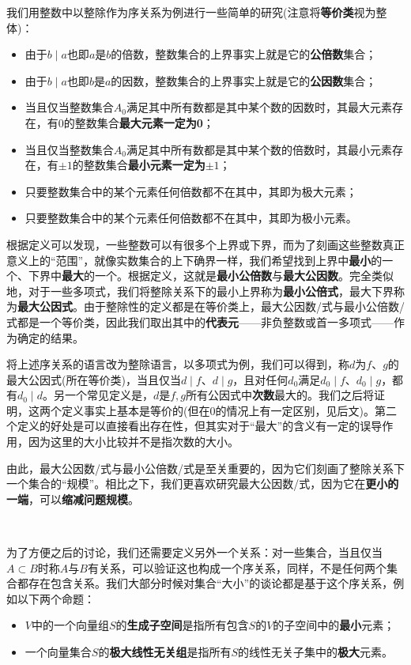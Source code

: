 \documentclass[a4paper,UTF8,fontset=windows,AutoFakeBold]{ctexart}
\newcommand*{\note}{\noindent *}
\begin{document}
\begin{enumerate}
    我们用整数中以整除作为序关系为例进行一些简单的研究(注意将\textbf{等价类}视为整体)：
    \begin{itemize}
        \item 由于$b\mid a$也即$a$是$b$的倍数，整数集合的上界事实上就是它的\textbf{公倍数}集合；
        \item 由于$b\mid a$也即$b$是$a$的因数，整数集合的上界事实上就是它的\textbf{公因数}集合；
        \item 当且仅当整数集合$A_0$满足其中所有数都是其中某个数的因数时，其最大元素存在，有0的整数集合\textbf{最大元素一定为0}；
        \item 当且仅当整数集合$A_0$满足其中所有数都是其中某个数的倍数时，其最小元素存在，有$\pm1$的整数集合\textbf{最小元素一定为$\pm1$}；
        \item 只要整数集合中的某个元素任何倍数都不在其中，其即为极大元素；
        \item 只要整数集合中的某个元素任何倍数都不在其中，其即为极小元素。
    \end{itemize}

    根据定义可以发现，一些整数可以有很多个上界或下界，而为了刻画这些整数真正意义上的``范围''，就像实数集合的上下确界一样，我们希望找到上界中\textbf{最小}的一个、下界中\textbf{最大}的一个。根据定义，这就是\textbf{最小公倍数}与\textbf{最大公因数}。完全类似地，对于一些多项式，我们将整除关系下的最小上界称为\textbf{最小公倍式}，最大下界称为\textbf{最大公因式}。由于整除性的定义都是在等价类上，最大公因数/式与最小公倍数/式都是一个等价类，因此我们取出其中的\textbf{代表元}——非负整数或首一多项式——作为确定的结果。
\end{enumerate}

\note 将上述序关系的语言改为整除语言，以多项式为例，我们可以得到，称$d$为$f$、$g$的最大公因式(所在等价类)，当且仅当$d\mid f$、$d\mid g$，且对任何$d_0$满足$d_0\mid f$、$d_0\mid g$，都有$d_0\mid d$。另一个常见定义是，$d$是$f,g$所有公因式中\textbf{次数}最大的。我们之后将证明，这两个定义事实上基本是等价的(但在0的情况上有一定区别，见后文)。第二个定义的好处是可以直接看出存在性，但其实对于``最大''的含义有一定的误导作用，因为这里的大小比较并不是指次数的大小。

\note 由此，最大公因数/式与最小公倍数/式是至关重要的，因为它们刻画了整除关系下一个集合的``规模''。相比之下，我们更喜欢研究最大公因数/式，因为它在\textbf{更小的一端}，可以\textbf{缩减问题规模}。

\

为了方便之后的讨论，我们还需要定义另外一个关系：对一些集合，当且仅当$A\subset B$时称$A$与$B$有关系，可以验证这也构成一个序关系，同样，不是任何两个集合都存在包含关系。我们大部分时候对集合``大小''的谈论都是基于这个序关系，例如以下两个命题：
\begin{itemize}
    \item $V$中的一个向量组$S$的\textbf{生成子空间}是指所有包含$S$的$V$的子空间中的\textbf{最小}元素；
    \item 一个向量集合$S$的\textbf{极大线性无关组}是指所有$S$的线性无关子集中的\textbf{极大}元素。
\end{itemize}
\end{document}
